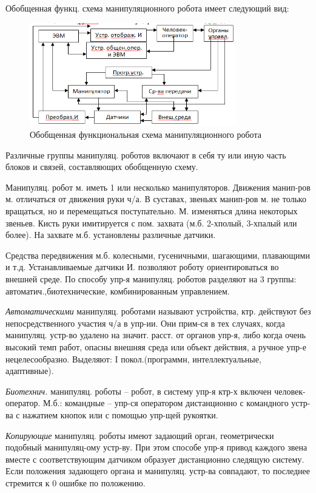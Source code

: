 \documentclass[unicode, 12pt, a4paper, oneside]{article}
\begin{document}
Обобщенная функц. схема манипуляционного робота имеет следующий вид:
\begin{figure}
\centering
\includegraphics[width=0.8\textwidth]{44_Manipul_robot.png}
\caption{Обобщенная функциональная схема манипуляционного робота}
\end{figure}

Различные группы манипуляц. роботов включают в себя ту или иную часть блоков и связей, составляющих обобщенную схему.

Манипуляц. робот м. иметь 1 или несколько манипуляторов. Движения манип-ров м. отличаться от движения руки ч/а. В суставах, звеньях манип-ров м. не только вращаться, но и перемещаться поступательно. М. изменяться длина некоторых звеньев. Кисть руки имитируется с пом. захвата (м.б. 2-хполый, 3-хпалый или более). На захвате м.б. установлены различные датчики.

Средства передвижения м.б. колесными, гусеничными, шагающими, плавающими и т.д.
Устанавливаемые датчики И. позволяют роботу ориентироваться во внешней среде.
По способу упр-я манипуляц. роботов разделяют на 3 группы: автоматич.,биотехнические, комбинированным управлением.

\textit{Автоматическими} манипуляц. роботами называют  устройства, ктр. действуют без непосредственного участия ч/а в упр-ии. Они прим-ся в тех случаях, когда манипуляц. устр-во удалено на значит. расст. от органов упр-я, либо когда очень высокий темп работ, опасны внешняя среда или объект действия, а ручное упр-е нецелесообразно.
Выделяют: I покол.(программн, интеллектуальные, адаптивные).

\textit{Биотехнич.} манипуляц. роботы – робот, в систему упр-я ктр-х включен человек-оператор. М.б.: командные – упр-ся оператором дистанционно с командного устр-ва с нажатием кнопок или с помощью упр-щей рукоятки.

\textit{Копирующие} манипуляц. роботы имеют задающий орган, геометрически подобный манипуляц-ому устр-ву. При этом способе упр-я привод каждого звена вместе с соответствующим датчиком образует дистанционно следящую систему. Если положения задающего органа и манипуляц. устр-ва совпадают, то последнее стремится к 0 ошибке по положению.
\end{document}
